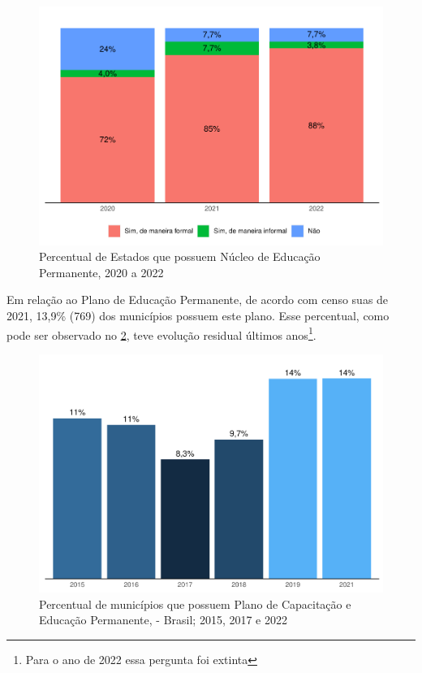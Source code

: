 \documentclass[
  brazilian]{report}
\begin{document}
\begin{figure}
\includegraphics{Censo-SUAS-2022_files/figure-latex/NUEP-1} \caption[Percentual de Estados que possuem Núcleo de Educação Permanente, 2020 a 2022]{Percentual de Estados que possuem Núcleo de Educação Permanente, 2020 a 2022}\label{fig:NUEP}
\end{figure}

Em relação ao Plano de Educação Permanente, de acordo com censo suas de
2021, 13,9\% (769) dos municípios possuem este plano. Esse percentual,
como pode ser observado no \cref{fig:PNEP_Munic}, teve evolução residual
últimos anos\footnote{Para o ano de 2022 essa pergunta foi extinta}.

\begin{figure}
\includegraphics{Censo-SUAS-2022_files/figure-latex/PNEP_Munic-1} \caption[Percentual de municípios que possuem Plano de Capacitação e Educação Permanente, - Brasil]{Percentual de municípios que possuem Plano de Capacitação e Educação Permanente, - Brasil; 2015, 2017 e 2022}\label{fig:PNEP_Munic}
\end{figure}
\end{document}
